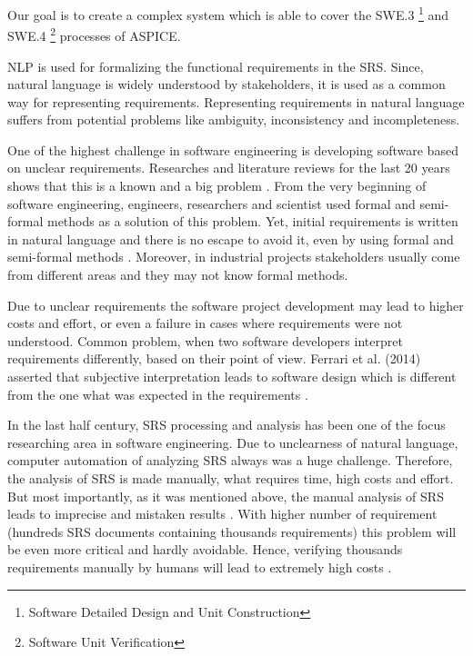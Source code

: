 	Our goal is to create a complex system which is able to cover the SWE.3 \footnote{Software Detailed Design and Unit Construction} and SWE.4 \footnote{Software Unit Verification} processes of \gls{ASPICE}.
\begin{multicols}{2}	
	\gls{NLP} is used for formalizing the functional requirements in the \gls{SRS}. Since, natural language is widely understood by stakeholders, it is used as a common way for representing requirements. Representing requirements in natural language suffers from potential problems like ambiguity, inconsistency and incompleteness.
	
	One of the highest challenge in software engineering is developing software based on unclear requirements. Researches and literature reviews for the last 20 years shows that this is a known and a big problem \cite{Besrour}. From the very beginning of software engineering, engineers, researchers and scientist used formal and semi-formal methods as a solution of this problem. Yet, initial requirements is written in natural language and there is no escape to avoid it, even by using formal and semi-formal methods \cite{Kamsties}. Moreover, in industrial projects stakeholders usually come from different areas and they may not know formal methods.
	
	Due to unclear requirements the software project development may lead to higher costs and effort, or even a failure in cases where requirements were not understood.
	Common problem, when two software developers interpret requirements differently, based on their point of view. Ferrari et al. (2014) asserted that subjective interpretation leads to software design which is different from the one what was expected in the requirements \cite{Ferrari}.
	
	In the last half century, \gls{SRS} processing and analysis has been one of the focus researching area in software engineering. Due to unclearness of natural language, computer automation of analyzing \gls{SRS} always was a huge challenge. Therefore, the analysis of \gls{SRS} is made manually, what requires time, high costs and effort. But most importantly, as it was mentioned above, the manual analysis of \gls{SRS} leads to imprecise and mistaken results \cite{Wang}. With higher number of requirement (hundreds \gls{SRS} documents containing thousands requirements) this problem will be even more critical and hardly avoidable. Hence, verifying thousands requirements manually by humans will lead to extremely high costs \cite{Fanmuy}.
	

\end{multicols}
